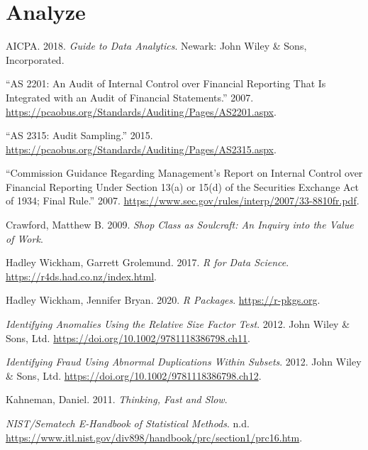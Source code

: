 \documentclass[
]{book}
\begin{document}
\hypertarget{analyze}{%
\section{Analyze}\label{analyze}}

\hypertarget{refs}{}
\leavevmode\hypertarget{ref-aicpa2018guide}{}%
AICPA. 2018. \emph{Guide to Data Analytics}. Newark: John Wiley \& Sons, Incorporated.

\leavevmode\hypertarget{ref-pcaob-as2201}{}%
``AS 2201: An Audit of Internal Control over Financial Reporting That Is Integrated with an Audit of Financial Statements.'' 2007. \url{https://pcaobus.org/Standards/Auditing/Pages/AS2201.aspx}.

\leavevmode\hypertarget{ref-pcaob-as2315}{}%
``AS 2315: Audit Sampling.'' 2015. \url{https://pcaobus.org/Standards/Auditing/Pages/AS2315.aspx}.

\leavevmode\hypertarget{ref-sec-princples-based}{}%
``Commission Guidance Regarding Management's Report on Internal Control over Financial Reporting Under Section 13(a) or 15(d) of the Securities Exchange Act of 1934; Final Rule.'' 2007. \url{https://www.sec.gov/rules/interp/2007/33-8810fr.pdf}.

\leavevmode\hypertarget{ref-shop-class}{}%
Crawford, Matthew B. 2009. \emph{Shop Class as Soulcraft: An Inquiry into the Value of Work}.

\leavevmode\hypertarget{ref-rfordatasci}{}%
Hadley Wickham, Garrett Grolemund. 2017. \emph{R for Data Science}. \url{https://r4ds.had.co.nz/index.html}.

\leavevmode\hypertarget{ref-r-pkgs}{}%
Hadley Wickham, Jennifer Bryan. 2020. \emph{R Packages}. \url{https://r-pkgs.org}.

\leavevmode\hypertarget{ref-nigrini-forensicanalytics-ch11}{}%
\emph{Identifying Anomalies Using the Relative Size Factor Test}. 2012. John Wiley \& Sons, Ltd. \url{https://doi.org/10.1002/9781118386798.ch11}.

\leavevmode\hypertarget{ref-nigrini-forensicanalytics-ch12}{}%
\emph{Identifying Fraud Using Abnormal Duplications Within Subsets}. 2012. John Wiley \& Sons, Ltd. \url{https://doi.org/10.1002/9781118386798.ch12}.

\leavevmode\hypertarget{ref-cognitive-ease}{}%
Kahneman, Daniel. 2011. \emph{Thinking, Fast and Slow}.

\leavevmode\hypertarget{ref-outliers}{}%
\emph{NIST/Sematech E-Handbook of Statistical Methods}. n.d. \url{https://www.itl.nist.gov/div898/handbook/prc/section1/prc16.htm}.
\end{document}
